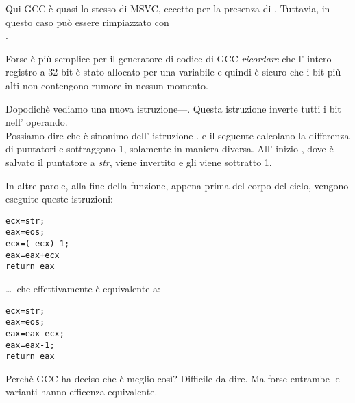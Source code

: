 Qui GCC è quasi lo stesso di MSVC, eccetto per la presenza di \MOVZX.
Tuttavia, in questo caso \MOVZX può essere rimpiazzato con\\
.

Forse è più semplice per il generatore di codice di GCC \emph{ricordare} 
che l' intero registro \EDX a 32-bit 
è stato allocato per una variabile \Tchar e quindi è sicuro che i bit più alti 
non contengono rumore in nessun momento.

\label{strlen_NOT_ADD}

Dopodichè vediamo una nuova istruzione---\NOT. Questa istruzione inverte tutti i bit nell' operando. \\
Possiamo dire che è sinonimo dell' istruzione . 
\NOT e il seguente \ADD calcolano la differenza di puntatori e sottraggono 1, solamente in maniera diversa. 
All' inizio \ECX, dove è salvato il puntatore a \emph{str}, viene invertito e gli viene sottratto 1.

In altre parole, alla fine della funzione, appena prima del corpo del ciclo, vengono eseguite queste istruzioni:

\begin{lstlisting}[style=customc]
ecx=str;
eax=eos;
ecx=(-ecx)-1; 
eax=eax+ecx
return eax
\end{lstlisting}

\dots~che effettivamente è equivalente a:

\begin{lstlisting}[style=customc]
ecx=str;
eax=eos;
eax=eax-ecx;
eax=eax-1;
return eax
\end{lstlisting}

Perchè GCC ha deciso che è meglio così? Difficile da dire.
Ma forse entrambe le varianti hanno efficenza equivalente.
